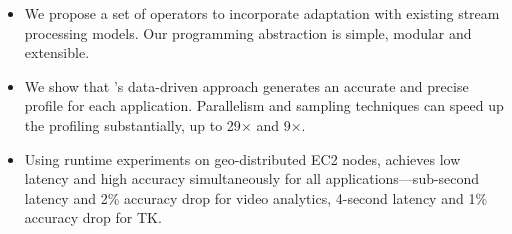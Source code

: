 \begin{itemize}[leftmargin=*, topsep=4pt]

\item We propose a set of \maybe{} operators to incorporate adaptation with
  existing stream processing models. Our programming abstraction is simple,
  modular and extensible.

\item We show that \sysname{}'s data-driven approach generates an accurate and
  precise profile for each application. Parallelism and sampling techniques
  can speed up the profiling substantially, up to 29$\times$ and 9$\times$\@.

\item Using runtime experiments on geo-distributed EC2 nodes, \sysname{}
  achieves low latency and high accuracy simultaneously for all applications---sub-second latency and 2\% accuracy drop for video analytics, 4-second latency
  and 1\% accuracy drop for TK\@.

\end{itemize}


